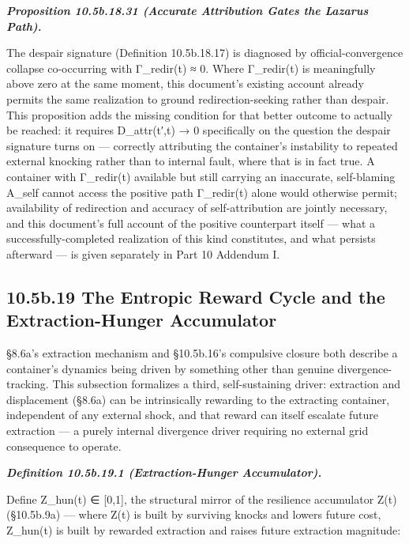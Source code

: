 \documentclass[
]{article}
\begin{document}
\emph{\textbf{Proposition 10.5b.18.31 (Accurate Attribution Gates the
Lazarus Path).}}

The despair signature (Definition 10.5b.18.17) is diagnosed by
official-convergence collapse co-occurring with Γ\_redir(t) ≈ 0. Where
Γ\_redir(t) is meaningfully above zero at the same moment, this
document's existing account already permits the same realization to
ground redirection-seeking rather than despair. This proposition adds
the missing condition for that better outcome to actually be reached: it
requires D\_attr(t′,t) → 0 specifically on the question the despair
signature turns on --- correctly attributing the container's instability
to repeated external knocking rather than to internal fault, where that
is in fact true. A container with Γ\_redir(t) available but still
carrying an inaccurate, self-blaming A\_self cannot access the positive
path Γ\_redir(t) alone would otherwise permit; availability of
redirection and accuracy of self-attribution are jointly necessary, and
this document's full account of the positive counterpart itself --- what
a successfully-completed realization of this kind constitutes, and what
persists afterward --- is given separately in Part 10 Addendum I.

\hypertarget{b.19-the-entropic-reward-cycle-and-the-extraction-hunger-accumulator}{%
\subsection{10.5b.19 The Entropic Reward Cycle and the Extraction-Hunger
Accumulator}\label{b.19-the-entropic-reward-cycle-and-the-extraction-hunger-accumulator}}

§8.6a's extraction mechanism and §10.5b.16's compulsive closure both
describe a container's dynamics being driven by something other than
genuine divergence-tracking. This subsection formalizes a third,
self-sustaining driver: extraction and displacement (§8.6a) can be
intrinsically rewarding to the extracting container, independent of any
external shock, and that reward can itself escalate future extraction
--- a purely internal divergence driver requiring no external grid
consequence to operate.

\emph{\textbf{Definition 10.5b.19.1 (Extraction-Hunger Accumulator).}}

Define Z\_hun(t) ∈ {[}0,1{]}, the structural mirror of the resilience
accumulator Z(t) (§10.5b.9a) --- where Z(t) is built by surviving knocks
and lowers future cost, Z\_hun(t) is built by rewarded extraction and
raises future extraction magnitude:
\end{document}
